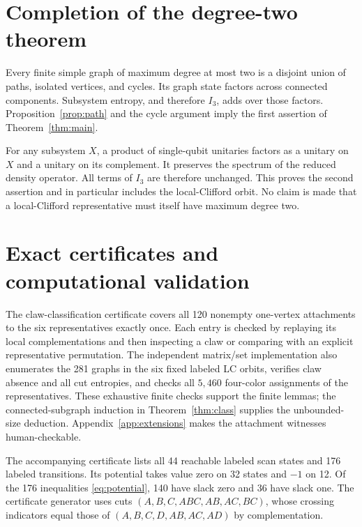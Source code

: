 \documentclass[11pt,letterpaper]{article}
\newcommand{\Ithree}{I_3}
\begin{document}
\section{Completion of the degree-two theorem}
Every finite simple graph of maximum degree at most two is a disjoint union of paths, isolated vertices, and cycles. Its graph state factors across connected components. Subsystem entropy, and therefore $\Ithree$, adds over those factors. Proposition~\ref{prop:path} and the cycle argument imply the first assertion of Theorem~\ref{thm:main}.

For any subsystem $X$, a product of single-qubit unitaries factors as a unitary on $X$ and a unitary on its complement. It preserves the spectrum of the reduced density operator. All terms of $\Ithree$ are therefore unchanged. This proves the second assertion and in particular includes the local-Clifford orbit. No claim is made that a local-Clifford representative must itself have maximum degree two.

\section{Exact certificates and computational validation}\label{sec:checks}
The claw-classification certificate covers all 120 nonempty one-vertex attachments to the six representatives exactly once. Each entry is checked by replaying its local complementations and then inspecting a claw or comparing with an explicit representative permutation. The independent matrix/set implementation also enumerates the 281 graphs in the six fixed labeled LC orbits, verifies claw absence and all cut entropies, and checks all $5{,}460$ four-color assignments of the representatives. These exhaustive finite checks support the finite lemmas; the connected-subgraph induction in Theorem~\ref{thm:class} supplies the unbounded-size deduction. Appendix~\ref{app:extensions} makes the attachment witnesses human-checkable.

The accompanying certificate lists all 44 reachable labeled scan states and 176 labeled transitions. Its potential takes value zero on 32 states and $-1$ on 12. Of the 176 inequalities \eqref{eq:potential}, 140 have slack zero and 36 have slack one. The certificate generator uses cuts $(A,B,C,ABC,AB,AC,BC)$, whose crossing indicators equal those of $(A,B,C,D,AB,AC,AD)$ by complementation.
\end{document}
